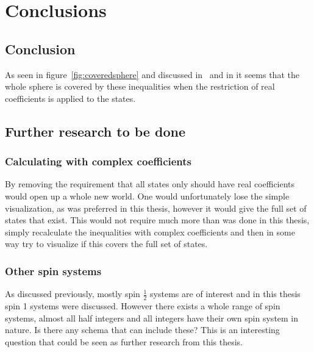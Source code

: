 \chapter{Conclusions}\label{cha:conclusions}
\newpage
\section{Conclusion}
As seen in figure~\ref{fig:coveredsphere} and discussed in~ and in  it seems that the whole sphere is covered by these inequalities when the restriction of real coefficients is applied to the states.  

\section{Further research to be done}
\subsection{Calculating with complex coefficients}
By removing the requirement that all states only should have real coefficients would open up a whole new world. One would unfortunately lose the simple visualization, as was preferred in this thesis, however it would give the full set of states that exist. This would not require much more than was done in this thesis, simply recalculate the inequalities with complex coefficients and then in some way try to visualize if this covers the full set of states. 
\subsection{Other spin systems}
As discussed previously, mostly spin $\frac{1}{2}$ systems are of interest and in this thesis spin 1 systems were discussed. However there exists a whole range of spin systems, almost all half integers and all integers have their own spin system in nature. Is there any schema that can include these? This is an interesting question that could be seen as further research from this thesis.
